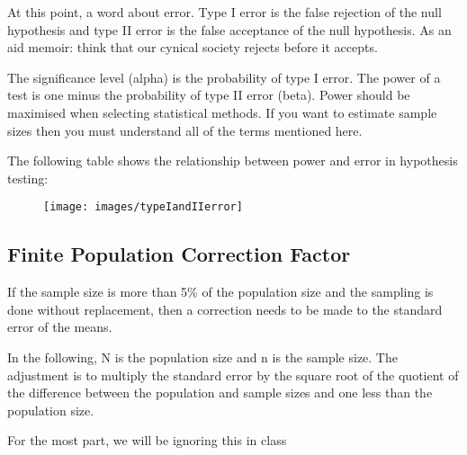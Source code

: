 \documentclass[]{report}
\begin{document}
At this point, a word about error. Type I error is the false rejection of the null hypothesis and type II error is the false acceptance of the null hypothesis. As an aid memoir: think that our cynical society rejects before it accepts.

The significance level (alpha) is the probability of type I error. The power of a test is one minus the probability of type II error (beta). Power should be maximised when selecting statistical methods. If you want to estimate sample sizes then you must understand all of the terms mentioned here.

The following table shows the relationship between power and error in hypothesis testing:

\newpage
\begin{figure}[h!]
\centering
\texttt{[image: images/typeIandIIerror]}
\end{figure}






\subsection{Finite Population Correction Factor}

If the sample size is more than 5\% of the population size and the sampling is done without replacement, then a correction needs to be made to the standard error of the means.

In the following, N is the population size and n is the sample size. The adjustment is to multiply the standard error by the square root of the quotient of the difference between the population and sample sizes and one less than the population size.  

For the most part, we will be ignoring this in class
\end{document}
